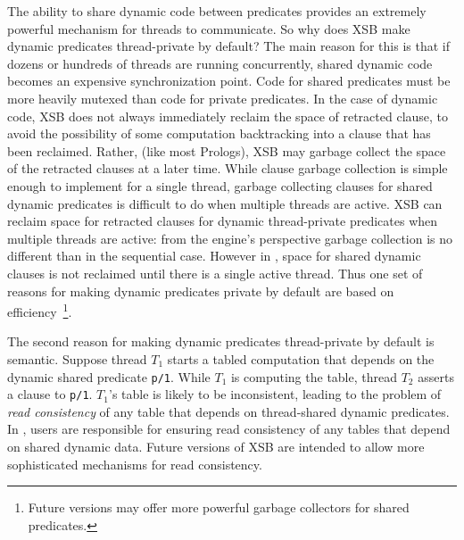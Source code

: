 The ability to share dynamic code between predicates provides an
extremely powerful mechanism for threads to communicate.  So why does
XSB make dynamic predicates thread-private by default?  The main
reason for this is that if dozens or hundreds of threads are running
concurrently, shared dynamic code becomes an expensive synchronization
point.  Code for shared predicates must be more heavily mutexed than
code for private predicates.  In the case of dynamic code, XSB does
not always immediately reclaim the space of retracted clause, to avoid
the possibility of some computation backtracking into a clause that
has been reclaimed.  Rather, (like most Prologs), XSB may garbage
collect the space of the retracted clauses at a later time.  While
clause garbage collection is simple enough to implement for a single
thread, garbage collecting clauses for shared dynamic predicates is
difficult to do when multiple threads are active.  XSB can reclaim
space for retracted clauses for dynamic thread-private predicates when
multiple threads are active: from the engine's perspective garbage
collection is no different than in the sequential case.  However in
\version , space for shared dynamic clauses is not reclaimed until
there is a single active thread.  Thus one set of reasons for making
dynamic predicates private by default are based on
efficiency~\footnote{Future versions may offer more powerful garbage
  collectors for shared predicates.}.

The second reason for making dynamic predicates thread-private by
default is semantic.  Suppose thread $T_1$ starts a tabled computation
that depends on the dynamic shared predicate {\tt p/1}.  While $T_1$
is computing the table, thread $T_2$ asserts a clause to {\tt p/1}.
$T_1$'s table is likely to be inconsistent, leading to the problem of
{\em read consistency} of any table that depends on thread-shared
dynamic predicates.  In \version , users are responsible for ensuring
read consistency of any tables that depend on shared dynamic data.
Future versions of XSB are intended to allow more sophisticated
mechanisms for read consistency.

